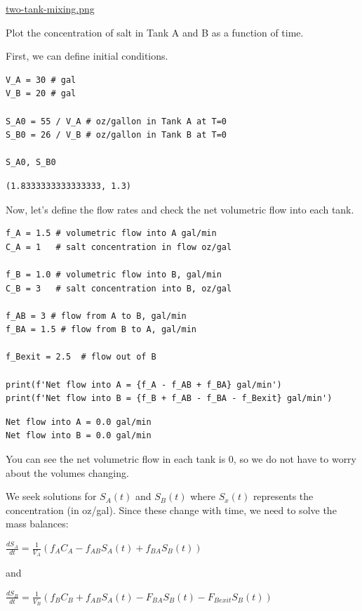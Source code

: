 \documentclass[11pt]{article}
\begin{document}
\url{two-tank-mixing.png}

Plot the concentration of salt in Tank A and B as a function of time.

First, we can define initial conditions.

\begin{verbatim}
V_A = 30 # gal
V_B = 20 # gal

S_A0 = 55 / V_A # oz/gallon in Tank A at T=0
S_B0 = 26 / V_B # oz/gallon in Tank B at T=0

S_A0, S_B0
\end{verbatim}

\begin{verbatim}
(1.8333333333333333, 1.3)
\end{verbatim}

Now, let's define the flow rates and check the net volumetric flow into each tank.

\begin{verbatim}
f_A = 1.5 # volumetric flow into A gal/min
C_A = 1   # salt concentration in flow oz/gal

f_B = 1.0 # volumetric flow into B, gal/min
C_B = 3   # salt concentration into B, oz/gal

f_AB = 3 # flow from A to B, gal/min
f_BA = 1.5 # flow from B to A, gal/min

f_Bexit = 2.5  # flow out of B

print(f'Net flow into A = {f_A - f_AB + f_BA} gal/min')
print(f'Net flow into B = {f_B + f_AB - f_BA - f_Bexit} gal/min')
\end{verbatim}

\begin{verbatim}
Net flow into A = 0.0 gal/min
Net flow into B = 0.0 gal/min

\end{verbatim}

You can see the net volumetric flow in each tank is 0, so we do not have to worry about the volumes changing.

We seek solutions for \(S_A(t)\) and \(S_B(t)\) where \(S_x(t)\) represents the concentration (in oz/gal). Since these change with time, we need to solve the mass balances:

\(\frac{dS_A}{dt} = \frac{1}{V_A}(f_A C_A - f_{AB} S_A(t) + f_{BA} S_B(t))\)

and

\(\frac{dS_B}{dt} = \frac{1}{V_B}(f_B C_B + f_{AB} S_A(t) - F_{BA} S_B(t) - F_{Bexit} S_B(t))\)
\end{document}

